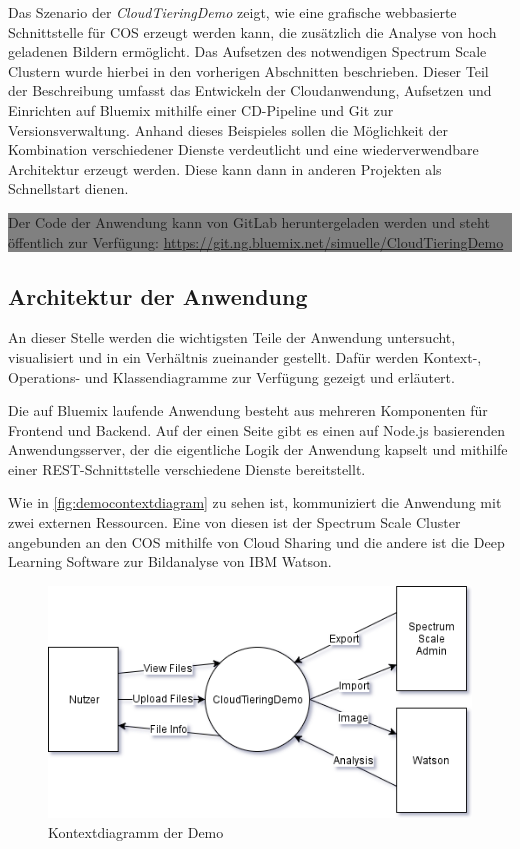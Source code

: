 Das Szenario der \textit{CloudTieringDemo} zeigt, wie eine grafische webbasierte Schnittstelle für \ac{COS} erzeugt werden kann, die zusätzlich die Analyse von hoch geladenen Bildern ermöglicht. Das Aufsetzen des notwendigen Spectrum Scale Clustern wurde hierbei in den vorherigen Abschnitten beschrieben.
Dieser Teil der Beschreibung umfasst das Entwickeln der Cloudanwendung, Aufsetzen und Einrichten auf Bluemix mithilfe einer \ac{CD}-Pipeline und \gls{Git} zur Versionsverwaltung. Anhand dieses Beispieles sollen die Möglichkeit der Kombination verschiedener Dienste verdeutlicht und eine wiederverwendbare Architektur erzeugt werden. Diese kann dann in anderen Projekten als Schnellstart dienen.

\begin{center}
	\colorbox{gray}{\parbox{0.9\textwidth}{Der Code der Anwendung kann von GitLab heruntergeladen werden und steht öffentlich zur Verfügung: \url{https://git.ng.bluemix.net/simuelle/CloudTieringDemo}}}
\end{center}

\subsection{Architektur der Anwendung}
An dieser Stelle werden die wichtigsten Teile der Anwendung untersucht, visualisiert und in ein Verhältnis zueinander gestellt. Dafür werden Kontext-, Operations- und Klassendiagramme zur Verfügung gezeigt und erläutert.

Die auf Bluemix laufende Anwendung besteht aus mehreren Komponenten für Frontend und Backend. Auf der einen Seite gibt es einen auf Node.js basierenden Anwendungsserver, der die eigentliche Logik der Anwendung kapselt und mithilfe einer \gls{REST}-Schnittstelle verschiedene Dienste bereitstellt.

Wie in \autoref{fig:democontextdiagram} zu sehen ist, kommuniziert die Anwendung mit zwei externen Ressourcen. Eine von diesen ist der Spectrum Scale Cluster angebunden an den \ac{COS} mithilfe von Cloud Sharing und die andere ist die Deep Learning Software zur Bildanalyse von IBM Watson.

\begin{figure}[hbt]
	\centering
	\includegraphics[scale=0.75]{images/demo-context-diagram}
	\caption{Kontextdiagramm der Demo}
	\label{fig:democontextdiagram}
\end{figure}

